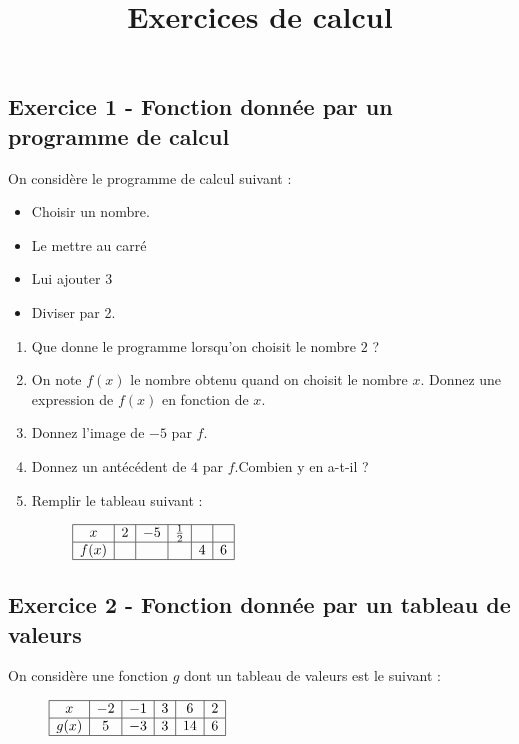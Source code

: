 \documentclass[14 pt, fleqn]{extarticle}
\title{Exercices de calcul}
\date{}
\theoremstyle{plain}
\begin{document}
	 
\subsection*{Exercice 1 - Fonction donnée par un programme de calcul}	 
	 
	 On considère le programme de calcul suivant : 
	 \begin{itemize}
	 \item Choisir un nombre.
	 \item Le mettre au carré 
	 \item Lui ajouter 3 
	 \item Diviser par 2.
	 \end{itemize}
	 
	 \begin{enumerate}
	 \item Que donne le programme lorsqu'on choisit le nombre $2$ ? 
	 \item On note $f(x)$ le nombre obtenu quand on choisit le nombre $x$. Donnez une expression de $f(x)$ en fonction de $x$. 
	 \item Donnez l'image de $-5$ par $f$. 
	 \item Donnez un antécédent de $4$ par $f$.Combien y en a-t-il ? 
	 \item Remplir le tableau suivant : 
	 
\begin{figure}[H]
\center
$\begin{array}{|c|c|c|c|c|c|}
\hline
 x &  2 & -5 & \frac12 &    &   \\
\hline
f(x)&   & & & 4 &   6   \\
\hline
\end{array}$
\end{figure}

	 \end{enumerate}
	 
	 
	 
\subsection*{Exercice 2 - Fonction donnée par un tableau de valeurs}	 
	 
On considère une fonction $g$ dont un tableau de valeurs est le suivant : \begin{figure}[H]
\center
$\begin{array}{|c|c|c|c|c|c|}
\hline
 x &  -2 & -1 & 3 & 6  &  2 \\
\hline
g(x)&  5 & -3  & 3 & 14 &   6   \\
\hline
\end{array}$
\end{figure}	 
\end{document}
